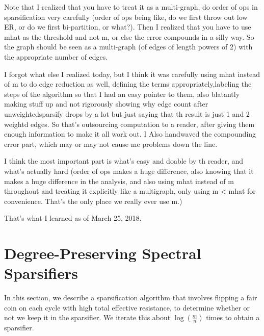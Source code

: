 Note that I realized that you have to treat it as a multi-graph, do order of ops
in sparsification very carefully (order of ops being like, do we first throw out
low ER, or do we first bi-partition, or what?). Then I realized that you have to
use mhat as the threshold and not m, or else the error compounds in a silly way.
So the graph should be seen as a multi-graph (of edges of length powers of 2) with the appropriate number of edges.

I forgot what else I realized today, but I think it was carefully using mhat
instead of m to do edge reduction as well, defining the terms
appropriately,labeling the steps of the algorithm so that I had an easy pointer
to them, also blatantly making stuff up and not rigorously showing why edge
count after unweightedsparsify drops by a lot but just saying that th result is just 1 and 2 weightd
edges. So that's outsourcing computation to a reader, after giving them enough
information to make it all work out. I Also handwaved the compounding error
part, which may or may not cause me problems down the line.

I think the most important part is what's easy and doable by th reader, and
what's actually hard (order of ops makes a huge difference, also knowing that it
makes a huge difference in the analysis, and also using mhat instead of m
throughout and treating it explicitly like a multigraph, only using m < mhat for
convenience. That's the only place we really ever use m.)

That's what I learned as of March 25, 2018.
\section{Degree-Preserving Spectral Sparsifiers}
\label{sec:DegreePreserving}

In this section, we describe a sparsification algorithm that involves flipping a
fair coin on each cycle with high total effective resistance, to determine
whether or not we keep it in the sparsifier. We iterate this about
$\log(\frac{m}{n})$ times to obtain a sparsifier.

